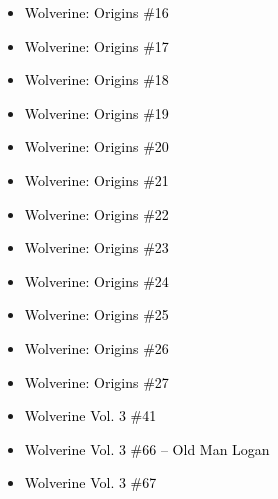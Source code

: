 \documentclass[12pt]{article}
\newcommand{\checkbox}{\raisebox{0.0ex}{\fbox{\rule{0ex}{1.5ex} \rule{1.5ex}{0ex}}}}
\begin{document}
\begin{tcolorbox}[
  colback=white!95!gray, colframe=black,
  width=\textwidth, arc=4mm, auto outer arc,
  boxrule=0.8pt,
  left=8pt,right=8pt,top=8pt,bottom=8pt
]
\begin{itemize}[left=0pt,label={\checkbox}]
  \item \textcolor{black}{Wolverine: Origins \#16}
  \item \textcolor{black}{Wolverine: Origins \#17}
  \item \textcolor{black}{Wolverine: Origins \#18}
  \item \textcolor{black}{Wolverine: Origins \#19}
  \item \textcolor{black}{Wolverine: Origins \#20}
  \item \textcolor{black}{Wolverine: Origins \#21}
  \item \textcolor{black}{Wolverine: Origins \#22}
  \item \textcolor{black}{Wolverine: Origins \#23}
  \item \textcolor{black}{Wolverine: Origins \#24}
  \item \textcolor{black}{Wolverine: Origins \#25}
  \item \textcolor{black}{Wolverine: Origins \#26}
  \item \textcolor{black}{Wolverine: Origins \#27}
  \item \textcolor{black}{Wolverine Vol. 3 \#41}
  \item \textcolor{black}{Wolverine Vol. 3 \#66 – Old Man Logan}
  \item \textcolor{black}{Wolverine Vol. 3 \#67}
\end{itemize}
\end{tcolorbox}
\end{document}
